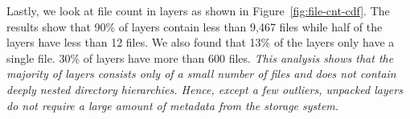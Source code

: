 Lastly, we look at file count in layers as shown in Figure~\ref{fig:file-cnt-cdf}.%
%
The results show that 90\% of layers contain less than 9,467 files while half
of the layers have less than 12 files.
%
We also found that 13\% of the layers only have a single file. 
30\% of layers have more than 600 files.
\textit{This analysis shows that the majority of layers consists only of a small number
of files and does not contain deeply nested directory hierarchies. Hence,
except a few outliers, unpacked layers do not require a large amount of
metadata from the storage system.}
%
%


%
%
%


